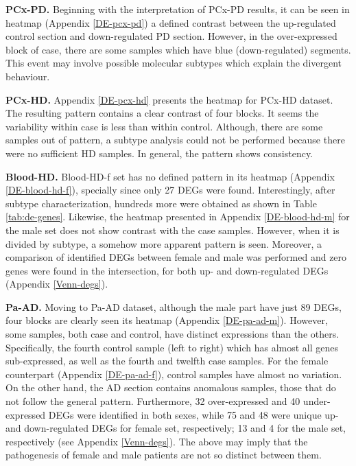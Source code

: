 \sloppy
\textbf{PCx-PD.} Beginning with the interpretation of PCx-PD results, it can be seen in heatmap (Appendix \ref{DE-pcx-pd}) a defined contrast between the up-regulated control section and down-regulated PD section. However, in the over-expressed block of case, there are some samples which have blue (down-regulated) segments. This event may involve possible molecular subtypes which explain the divergent behaviour.

\textbf{PCx-HD.} Appendix \ref{DE-pcx-hd} presents the heatmap for PCx-HD dataset. The resulting pattern contains a clear contrast of four blocks. It seems the variability within case is less than within control. Although, there are some samples out of pattern, a subtype analysis could not be performed because there were no sufficient HD samples. In general, the pattern shows consistency.

\textbf{Blood-HD.} Blood-HD-f set has no defined pattern in its heatmap (Appendix \ref{DE-blood-hd-f}), specially since only 27 DEGs were found. Interestingly, after subtype characterization, hundreds more were obtained as shown in Table \ref{tab:de-genes}. Likewise, the heatmap presented in Appendix \ref{DE-blood-hd-m} for the male set does not show contrast with the case samples. However, when it is divided by subtype, a somehow more apparent pattern is seen. Moreover, a comparison of identified DEGs between female and male was performed and zero genes were found in the intersection, for both up- and down-regulated DEGs (Appendix \ref{Venn-degs}).

\textbf{Pa-AD.} Moving to Pa-AD dataset, although the male part have just 89 DEGs, four blocks are clearly seen its heatmap (Appendix \ref{DE-pa-ad-m}). However, some samples, both case and control, have distinct expressions than the others. Specifically, the fourth control sample (left to right) which has almost all genes sub-expressed, as well as the fourth and twelfth case samples. For the female counterpart (Appendix \ref{DE-pa-ad-f}), control samples have almost no variation. On the other hand, the AD section contains anomalous samples, those that do not follow the general pattern. Furthermore, 32 over-expressed and 40 under-expressed DEGs were identified in both sexes, while 75 and 48 were unique up- and down-regulated DEGs for female set, respectively; 13 and 4 for the male set, respectively (see Appendix \ref{Venn-degs}). The above may imply that the pathogenesis of female and male patients are not so distinct between them.

